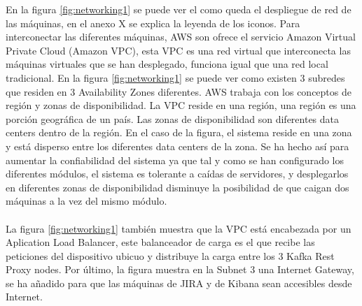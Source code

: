 En la figura \ref{fig:networking1} se puede ver el como queda el despliegue de red de las máquinas, en el anexo X se explica la leyenda de los iconos. Para interconectar las diferentes máquinas, AWS son ofrece el servicio Amazon Virtual Private Cloud (Amazon VPC), esta VPC es una red virtual que interconecta las máquinas virtuales que se han desplegado, funciona igual que una red local tradicional. En la figura \ref{fig:networking1} se puede ver como existen 3 subredes que residen en 3 Availability Zones diferentes. AWS trabaja con los conceptos de región y zonas de disponibilidad. La VPC reside en una región, una región es una porción geográfica de un país. Las zonas de disponibilidad son diferentes data centers dentro de la región. En el caso de la figura, el sistema reside en una zona y está disperso entre los diferentes data centers de la zona. Se ha hecho así para aumentar la confiabilidad del sistema ya que tal y como se han configurado los diferentes módulos, el sistema es tolerante a caídas de servidores, y desplegarlos en diferentes zonas de disponibilidad disminuye la posibilidad de que caigan dos máquinas a la vez del mismo módulo.
\\\\
La figura \ref{fig:networking1} también muestra que la VPC está encabezada por un Aplication Load Balancer, este balanceador de carga es el que recibe las peticiones del dispositivo ubicuo y distribuye la carga entre los 3 Kafka Rest Proxy nodes. Por último, la figura muestra en la Subnet 3 una Internet Gateway, se ha añadido para que las máquinas de JIRA y de Kibana sean accesibles desde Internet.



